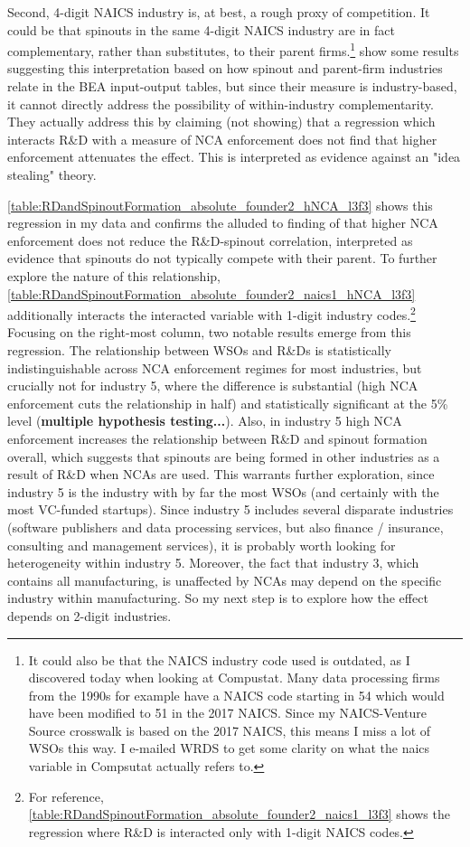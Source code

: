 \documentclass[11pt,english]{article}
\begin{document}
Second, 4-digit NAICS industry is, at best, a rough proxy of competition. It could be that spinouts in the same 4-digit NAICS industry are in fact complementary, rather than substitutes, to their parent firms.\footnote{It could also be that the NAICS industry code used is outdated, as I discovered today when looking at Compustat. Many data processing firms from the 1990s for example have a NAICS code starting in 54 which would have been modified to 51 in the 2017 NAICS. Since my NAICS-Venture Source crosswalk is based on the 2017 NAICS, this means I miss a lot of WSOs this way. I e-mailed WRDS to get some clarity on what the naics variable in Compsutat actually refers to.} \cite{babina_entrepreneurial_2019} show some results suggesting this interpretation based on how spinout and parent-firm industries relate in the BEA input-output tables, but since their measure is industry-based, it cannot directly address the possibility of within-industry complementarity. They actually address this by claiming (not showing) that a regression which interacts R\&D with a measure of NCA enforcement does not find that higher enforcement attenuates the effect. This is interpreted as evidence against an "idea stealing" theory.  

\autoref{table:RDandSpinoutFormation_absolute_founder2_hNCA_l3f3} shows this regression in my data and confirms the alluded to finding of \cite{babina_entrepreneurial_2019} that higher NCA enforcement does not reduce the R\&D-spinout correlation, interpreted as evidence that spinouts do not typically compete with their parent. To further explore the nature of this relationship, \autoref{table:RDandSpinoutFormation_absolute_founder2_naics1_hNCA_l3f3} additionally interacts the interacted variable with 1-digit industry codes.\footnote{For reference, \autoref{table:RDandSpinoutFormation_absolute_founder2_naics1_l3f3} shows the regression where R\&D is interacted only with 1-digit NAICS codes.} Focusing on the right-most column, two notable results emerge from this regression. The relationship between WSOs and R\&Ds is statistically indistinguishable across NCA enforcement regimes for most industries, but crucially not for industry 5, where the difference is substantial (high NCA enforcement cuts the relationship in half) and statistically significant at the 5\% level (\textbf{multiple hypothesis testing...}). Also, in industry 5 high NCA enforcement increases the relationship between R\&D and spinout formation  overall, which suggests that spinouts are being formed in other industries as a result of R\&D when NCAs are used. This warrants further exploration, since industry 5 is the industry with by far the most WSOs (and certainly with the most VC-funded startups). Since industry 5 includes several disparate industries (software publishers and data processing services, but also finance / insurance, consulting and management services), it is probably worth looking for heterogeneity within industry 5. Moreover, the fact that industry 3, which contains all manufacturing, is unaffected by NCAs may depend on the specific industry within manufacturing. So my next step is to explore how the effect depends on 2-digit industries.
\end{document}
